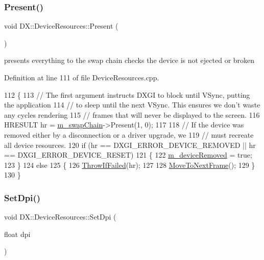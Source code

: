 \subsubsection{\texorpdfstring{Present()}{Present()}}
{\footnotesize\ttfamily void D\+X\+::\+Device\+Resources\+::\+Present (\begin{DoxyParamCaption}{ }\end{DoxyParamCaption})}



presents everything to the swap chain checks the device is not ejected or broken 



Definition at line 111 of file Device\+Resources.\+cpp.


\begin{DoxyCode}
112 \{
113     \textcolor{comment}{// The first argument instructs DXGI to block until VSync, putting the application}
114     \textcolor{comment}{// to sleep until the next VSync. This ensures we don't waste any cycles rendering}
115     \textcolor{comment}{// frames that will never be displayed to the screen.}
116     HRESULT hr = \mbox{\hyperlink{class_d_x_1_1_device_resources_a8f067c81561cd51ac8e59a89e868571b}{m\_swapChain}}->Present(1, 0);
117 
118     \textcolor{comment}{// If the device was removed either by a disconnection or a driver upgrade, we }
119     \textcolor{comment}{// must recreate all device resources.}
120     \textcolor{keywordflow}{if} (hr == DXGI\_ERROR\_DEVICE\_REMOVED || hr == DXGI\_ERROR\_DEVICE\_RESET)
121     \{
122         \mbox{\hyperlink{class_d_x_1_1_device_resources_af4d113c651dcae9a344094cfc02a6a09}{m\_deviceRemoved}} = \textcolor{keyword}{true};
123     \}
124     \textcolor{keywordflow}{else}
125     \{
126         \mbox{\hyperlink{_direct_x_helper_8h_abca3eeca6b5772a1112e0a9a9e3d9013}{ThrowIfFailed}}(hr);
127 
128         \mbox{\hyperlink{class_d_x_1_1_device_resources_af7005ac5c0fb7c7582740d0a767398c6}{MoveToNextFrame}}();
129     \}
130 \}
\end{DoxyCode}
\mbox{\label{class_d_x_1_1_device_resources_a82722ab9c5a11d27664e89b6a375902e}} 
\subsubsection{\texorpdfstring{Set\+Dpi()}{SetDpi()}}
{\footnotesize\ttfamily void D\+X\+::\+Device\+Resources\+::\+Set\+Dpi (\begin{DoxyParamCaption}\item[{float}]{dpi }\end{DoxyParamCaption})}



